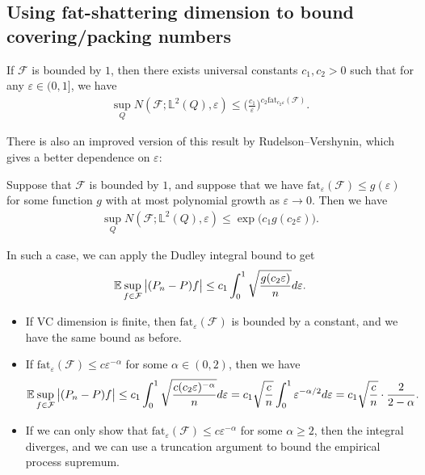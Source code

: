 \documentclass[11pt,letterpaper]{article}
\numberwithin{theorem}{lecture}
\numberwithin{proposition}{lecture}
\numberwithin{lemma}{lecture}
\numberwithin{claim}{lecture}
\numberwithin{corollary}{lecture}
\numberwithin{definition}{lecture}
\numberwithin{conjecture}{lecture}
\numberwithin{remark}{lecture}
\numberwithin{example}{lecture}
\numberwithin{equation}{lecture}
\begin{document}
\subsection{Using fat-shattering dimension to bound covering/packing numbers}
\begin{theorem}
  If $\mathcal{F}$ is bounded by $1$, then there exists universal constants $c_1, c_2 > 0$ such that for any $\varepsilon \in (0, 1]$, we have
  \begin{align*}
    \sup_{Q} N (\mathcal{F}; \mathbb{L}^2 (Q), \varepsilon) \leq \Big( \frac{c_1}{\varepsilon} \Big)^{c_2 \text{fat}_{c_2 \varepsilon} (\mathcal{F})}.
  \end{align*}
\end{theorem}
There is also an improved version of this result by Rudelson--Vershynin, which gives a better dependence on $\varepsilon$:
\begin{theorem}
  Suppose that $\mathcal{F}$ is bounded by $1$, and suppose that we have $\text{fat}_\varepsilon (\mathcal{F}) \leq g (\varepsilon)$ for some function $g$ with at most polynomial growth as $\varepsilon \to 0$. Then we have
  \begin{align*}
    \sup_{Q} N (\mathcal{F}; \mathbb{L}^2 (Q), \varepsilon) \leq \exp \Big( c_1 g (c_2 \varepsilon) \Big).
  \end{align*}
\end{theorem}
In such a case, we can apply the Dudley integral bound to get
\begin{align*}
  {\mathbb{E}} \sup_{f \in \mathcal{F}} \big|(P_n - P) f\big| \leq c_1 \int_0^1 \sqrt{\frac{g (c_2 \varepsilon)}{n}} d \varepsilon.
\end{align*}
\begin{itemize}
  \item If VC dimension is finite, then $\text{fat}_\varepsilon (\mathcal{F})$ is bounded by a constant, and we have the same bound as before.
  \item If $\text{fat}_\varepsilon (\mathcal{F}) \leq c \varepsilon^{-\alpha}$ for some $\alpha \in (0, 2)$, then we have
  \begin{align*}
    {\mathbb{E}} \sup_{f \in \mathcal{F}} \big|(P_n - P) f\big| \leq c_1 \int_0^1 \sqrt{\frac{c (c_2 \varepsilon)^{-\alpha}}{n}} d \varepsilon = c_1 \sqrt{\frac{c}{n}} \int_0^1 \varepsilon^{-\alpha/2} d \varepsilon = c_1 \sqrt{\frac{c}{n}} \cdot \frac{2}{2 - \alpha}.
  \end{align*}
  \item If we can only show that $\text{fat}_\varepsilon (\mathcal{F}) \leq c \varepsilon^{-\alpha}$ for some $\alpha \geq 2$, then the integral diverges, and we can use a truncation argument to bound the empirical process supremum.
\end{itemize}
\end{document}
